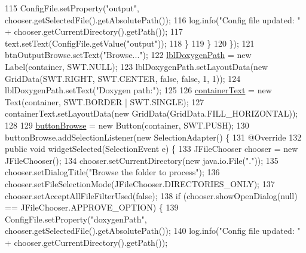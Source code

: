 \begin{DoxyCode}
115                     ConfigFile.setProperty(\textcolor{stringliteral}{"output"}, chooser.getSelectedFile().getAbsolutePath());
116                     log.info(\textcolor{stringliteral}{"Config file updated: "} + chooser.getCurrentDirectory().getPath());
117                     text.setText(ConfigFile.getValue(\textcolor{stringliteral}{"output"}));
118                 \}
119             \}
120         \});
121         btnOutputBrowse.setText(\textcolor{stringliteral}{"Browse..."});
122         \hyperlink{classit_1_1isislab_1_1masonassisteddocumentation_1_1mason_1_1wizards_1_1_b___project_information_page_a4887707c3be26291594a2d0010abd500}{lblDoxygenPath} = \textcolor{keyword}{new} Label(container, SWT.NULL);
123         lblDoxygenPath.setLayoutData(\textcolor{keyword}{new} GridData(SWT.RIGHT, SWT.CENTER, \textcolor{keyword}{false}, \textcolor{keyword}{false}, 1, 1));
124         lblDoxygenPath.setText(\textcolor{stringliteral}{"Doxygen path:"});
125 
126         \hyperlink{classit_1_1isislab_1_1masonassisteddocumentation_1_1mason_1_1wizards_1_1_b___project_information_page_afd09135c84c569cc68148a0166b9390a}{containerText} = \textcolor{keyword}{new} Text(container, SWT.BORDER | SWT.SINGLE);
127         containerText.setLayoutData(\textcolor{keyword}{new} GridData(GridData.FILL\_HORIZONTAL));
128 
129         \hyperlink{classit_1_1isislab_1_1masonassisteddocumentation_1_1mason_1_1wizards_1_1_b___project_information_page_a0962e195aa316ea8c931a45b59971432}{buttonBrowse} = \textcolor{keyword}{new} Button(container, SWT.PUSH);
130         buttonBrowse.addSelectionListener(\textcolor{keyword}{new} SelectionAdapter() \{
131             @Override
132             \textcolor{keyword}{public} \textcolor{keywordtype}{void} widgetSelected(SelectionEvent e) \{
133                 JFileChooser chooser = \textcolor{keyword}{new} JFileChooser();
134                 chooser.setCurrentDirectory(\textcolor{keyword}{new} java.io.File(\textcolor{stringliteral}{"."}));
135                 chooser.setDialogTitle(\textcolor{stringliteral}{"Browse the folder to process"});
136                 chooser.setFileSelectionMode(JFileChooser.DIRECTORIES\_ONLY);
137                 chooser.setAcceptAllFileFilterUsed(\textcolor{keyword}{false});
138                 \textcolor{keywordflow}{if} (chooser.showOpenDialog(null) == JFileChooser.APPROVE\_OPTION) \{                  
139                     ConfigFile.setProperty(\textcolor{stringliteral}{"doxygenPath"}, chooser.getSelectedFile().getAbsolutePath());
140                     log.info(\textcolor{stringliteral}{"Config file updated: "} + chooser.getCurrentDirectory().getPath());

\end{DoxyCode}

